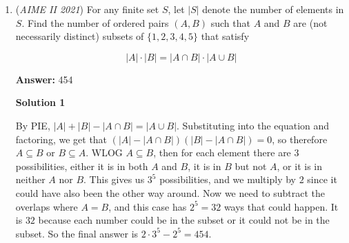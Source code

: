\begin{enumerate}
 The largest area of triangle with sides $4$ and $10$ is $20$ for a right triangle with legs $4$ and $10$ ($AC\perp AB$).

 The diagram shows triangles with equal heights. The yellow triangle $ABC'$ has the longest side $BC',$ the blue triangle $ABC$ has the longest side $AC.$If $BC\perp AB,$ then$BC = \sqrt {AC^2 – AB^2} = 2 \sqrt{21}$ the area is equal to $4\sqrt{21}.$ In the interval, the blue triangle $ABC$ is acute-angled, the yellow triangle $ABC'$ is obtuse-angled. Their heights and areas are equal. The condition is met.

 If the area is less than $4\sqrt{21},$ both triangles are obtuse, not equal, so the condition is not met.

 Therefore, $s$ is in the range $\left[ 4 \sqrt{21}, 20\right)$, so answer is $\left(4 \sqrt{21}\right)^{2} + 20^{2} = \boxed{736}$

 \textbf{vladimir.shelomovskii@gmail.com, vvsss}

 



\textbf{Solution 8}

If $4$ and $10$ are the shortest sides and $\angle C$ is the included angle, then the area is 
 \[\frac{4\cdot10\cdot\sin\angle C}{2} = 20\sin\angle C.\]Because $0\leq\sin\angle C\leq1$, the maximum value of $20\sin\angle C$ is $20$, so $s\leq20$.

 If $4$ is a shortest side and $10$ is the longest side, the length of the other short side is $4\cos\angle C+2\sqrt{4\cos^2 \angle C+21}$ by law of cosines, and the area is $2\left(4\cos\angle C+2\sqrt{4\cos^2\angle C+21}\right)\sqrt{1-\cos\angle C}$. Because $-1\le \cos\angle C\le 0$, this is minimized if $\cos\angle C=0$, where $s=4\sqrt{21}$.

 So, the answer is $20^2+\left(4\sqrt{21}\right)^2=\boxed{736}$.

 


	\item (\textit{AIME II 2021}) For any finite set $S$, let $|S|$ denote the number of elements in $S$. Find the number of ordered pairs $(A,B)$ such that $A$ and $B$ are (not necessarily distinct) subsets of $\{1,2,3,4,5\}$ that satisfy

 \[|A| \cdot |B| = |A \cap B| \cdot |A \cup B|\]

 \textbf{Answer: }454



\textbf{Solution 1}

By PIE, $|A|+|B|-|A \cap B| = |A \cup B|$. Substituting into the equation and factoring, we get that $(|A| - |A \cap B|)(|B| - |A \cap B|) = 0$, so therefore $A \subseteq B$ or $B \subseteq A$. WLOG $A\subseteq B$, then for each element there are $3$ possibilities, either it is in both $A$ and $B$, it is in $B$ but not $A$, or it is in neither $A$ nor $B$. This gives us $3^{5}$ possibilities, and we multiply by $2$ since it could have also been the other way around. Now we need to subtract the overlaps where $A=B$, and this case has $2^{5}=32$ ways that could happen. It is $32$ because each number could be in the subset or it could not be in the subset. So the final answer is $2\cdot 3^5 - 2^5 = \boxed{454}$.


\end{enumerate}
